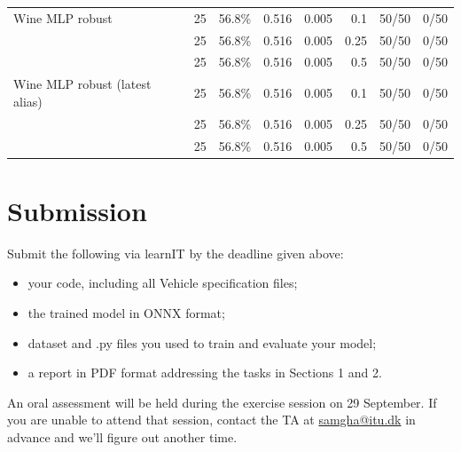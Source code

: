 \documentclass[11pt,a4paper]{article}
\begin{document}
\begin{center}
\begin{tabular}{lrrrrrrr}
    Wine MLP robust & 25 & 56.8\% & 0.516 & 0.005 & 0.1 & 50/50 & 0/50 \\
             & 25 & 56.8\% & 0.516 & 0.005 & 0.25 & 50/50 & 0/50 \\
             & 25 & 56.8\% & 0.516 & 0.005 & 0.5 & 50/50 & 0/50 \\
    Wine MLP robust (latest alias) & 25 & 56.8\% & 0.516 & 0.005 & 0.1 & 50/50 & 0/50 \\
             & 25 & 56.8\% & 0.516 & 0.005 & 0.25 & 50/50 & 0/50 \\
             & 25 & 56.8\% & 0.516 & 0.005 & 0.5 & 50/50 & 0/50 \\
    \bottomrule
  \end{tabular}
\end{center}

\section*{Submission}

Submit the following via learnIT by the deadline given above:

\begin{itemize}[leftmargin=*]
  \item your code, including all Vehicle specification files;
  \item the trained model in ONNX format;
  \item dataset and .py files you used to train and evaluate your model;
  \item a report in PDF format addressing the tasks in Sections 1 and 2.
\end{itemize}

An oral assessment will be held during the exercise session on 29 September. If you are unable to attend that session, contact the TA at \href{mailto:samgha@itu.dk}{samgha@itu.dk} in advance and we'll figure out another time.
\end{document}
